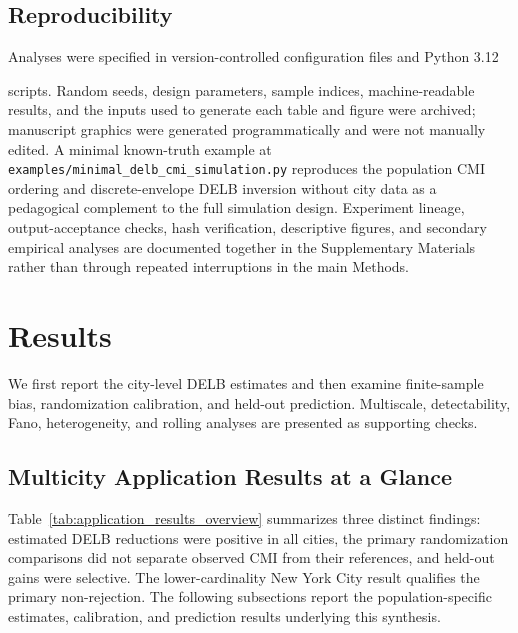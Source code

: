 \documentclass[applsci,article,accept,moreauthors]{Definitions/mdpi}
\def\hl#1{#1}%
\def\colorbox#1#2{#2}%
\begin{document}
\subsection{Reproducibility}
\label{subsec:reproducibility}

Analyses were specified in version-controlled configuration files and \colorbox{green}{Python} \hl{3.12} %

scripts. Random seeds, design parameters, sample indices, machine-readable
results, and the inputs used to generate each table and figure were archived;
manuscript graphics were generated programmatically and were not manually
edited. A minimal known-truth example at
\texttt{examples/minimal\_delb\_cmi\_simulation.py} reproduces the population
CMI ordering and discrete-envelope DELB inversion without city data as a
pedagogical complement to the full simulation design. Experiment
lineage, output-acceptance checks, hash verification, descriptive figures, and
secondary empirical analyses are documented together in the Supplementary
Materials rather than through repeated interruptions in the main Methods.

\section{Results}
\label{sec:results}

We first report the city-level DELB estimates and then examine finite-sample
bias, randomization calibration, and held-out prediction. Multiscale,
detectability, Fano, heterogeneity, and rolling analyses are presented as
supporting checks.

\subsection{Multicity Application Results at a Glance}
\label{subsec:application_results_overview}

{Table~\ref{tab:application_results_overview} summarizes three distinct
findings: estimated DELB reductions were positive in all cities, the primary
randomization comparisons did not separate observed CMI from their
references, and held-out gains were selective. The lower-cardinality New York
City result qualifies the primary non-rejection. The following subsections
report the population-specific estimates, calibration, and prediction results
underlying this synthesis.}
\end{document}
